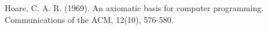 
\begin{thebibliography}{}
    \bibitem[1969]{}
    	Hoare, C. A. R. (1969). An axiomatic basis for computer programming. Communications of the ACM, 12(10), 576-580.
\end{thebibliography}